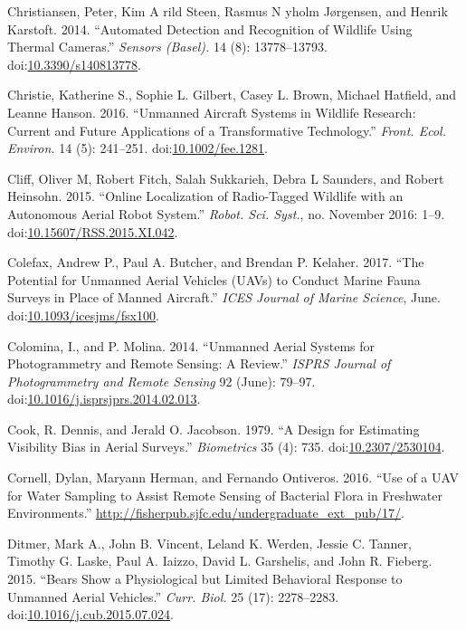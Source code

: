 \documentclass[]{interact}
\theoremstyle{plain}%
\theoremstyle{definition}
\theoremstyle{remark}
\begin{document}
\hypertarget{ref-christiansen_automated_2014}{}
Christiansen, Peter, Kim A rild Steen, Rasmus N yholm Jørgensen, and
Henrik Karstoft. 2014. ``Automated Detection and Recognition of Wildlife
Using Thermal Cameras.'' \emph{Sensors (Basel).} 14 (8): 13778--13793.
doi:\href{https://doi.org/10.3390/s140813778}{10.3390/s140813778}.

\hypertarget{ref-christie_unmanned_2016}{}
Christie, Katherine S., Sophie L. Gilbert, Casey L. Brown, Michael
Hatfield, and Leanne Hanson. 2016. ``Unmanned Aircraft Systems in
Wildlife Research: Current and Future Applications of a Transformative
Technology.'' \emph{Front. Ecol. Environ.} 14 (5): 241--251.
doi:\href{https://doi.org/10.1002/fee.1281}{10.1002/fee.1281}.

\hypertarget{ref-cliff_online_2015}{}
Cliff, Oliver M, Robert Fitch, Salah Sukkarieh, Debra L Saunders, and
Robert Heinsohn. 2015. ``Online Localization of Radio-Tagged Wildlife
with an Autonomous Aerial Robot System.'' \emph{Robot. Sci. Syst.}, no.
November 2016: 1--9.
doi:\href{https://doi.org/10.15607/RSS.2015.XI.042}{10.15607/RSS.2015.XI.042}.

\hypertarget{ref-colefax_potential_2017}{}
Colefax, Andrew P., Paul A. Butcher, and Brendan P. Kelaher. 2017. ``The
Potential for Unmanned Aerial Vehicles (UAVs) to Conduct Marine Fauna
Surveys in Place of Manned Aircraft.'' \emph{ICES Journal of Marine
Science}, June.
doi:\href{https://doi.org/10.1093/icesjms/fsx100}{10.1093/icesjms/fsx100}.

\hypertarget{ref-colomina_unmanned_2014}{}
Colomina, I., and P. Molina. 2014. ``Unmanned Aerial Systems for
Photogrammetry and Remote Sensing: A Review.'' \emph{ISPRS Journal of
Photogrammetry and Remote Sensing} 92 (June): 79--97.
doi:\href{https://doi.org/10.1016/j.isprsjprs.2014.02.013}{10.1016/j.isprsjprs.2014.02.013}.

\hypertarget{ref-cook_design_1979}{}
Cook, R. Dennis, and Jerald O. Jacobson. 1979. ``A Design for Estimating
Visibility Bias in Aerial Surveys.'' \emph{Biometrics} 35 (4): 735.
doi:\href{https://doi.org/10.2307/2530104}{10.2307/2530104}.

\hypertarget{ref-cornell_use_2016}{}
Cornell, Dylan, Maryann Herman, and Fernando Ontiveros. 2016. ``Use of a
UAV for Water Sampling to Assist Remote Sensing of Bacterial Flora in
Freshwater Environments.''
\url{http://fisherpub.sjfc.edu/undergraduate_ext_pub/17/}.

\hypertarget{ref-ditmer_bears_2015}{}
Ditmer, Mark A., John B. Vincent, Leland K. Werden, Jessie C. Tanner,
Timothy G. Laske, Paul A. Iaizzo, David L. Garshelis, and John R.
Fieberg. 2015. ``Bears Show a Physiological but Limited Behavioral
Response to Unmanned Aerial Vehicles.'' \emph{Curr. Biol.} 25 (17):
2278--2283.
doi:\href{https://doi.org/10.1016/j.cub.2015.07.024}{10.1016/j.cub.2015.07.024}.
\end{document}
